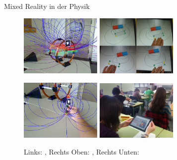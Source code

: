 \begin{frame}[fragile]{Mixed Reality in der Physik}

\begin{figure}
	\includegraphics[width=0.35\textwidth]{images/Buchau09.jpg}
	\hspace{0.05cm}
	\includegraphics[width=0.35\textwidth]{images/Matsutomo13.jpg}

	\includegraphics[width=0.35\textwidth]{images/Buchau09_Magnet.jpg}
	\hspace{0.05cm}
	\includegraphics[width=0.35\textwidth]{images/Ibanez14.jpg}

	\setlength{\abovecaptionskip}{5pt plus 5pt minus 2pt}
	\caption*{Links: \citep{Buchau09}, Rechts Oben: \cite{Matsutomo13}, Rechts Unten: \cite{Ibanez14}}
\end{figure}
\end{frame}

